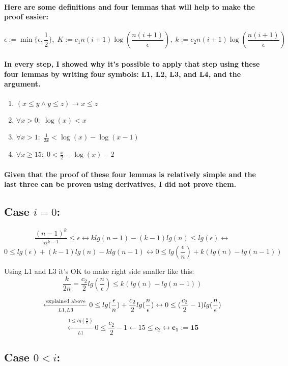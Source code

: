 \documentclass[oneside]{book}
\newcommand{\myparagraph}[1]{\paragraph{\textnormal{#1}}}
\begin{document}
\myparagraph{
Here are some definitions and four lemmas that will help to make the proof easier:
}

$$\epsilon := \min\{\epsilon, \frac{1}{2}\}, \; K := c_1n(i+1)\log(\frac{n(i+1)}{\epsilon}),\; k := c_2n(i+1)\log(\frac{n(i+1)}{\epsilon})$$

\myparagraph{
In every step, I showed why it's possible to apply that step using these four lemmas by writing four symbols: L1, L2, L3, and L4, and the argument.
}

\begin{enumerate}
    \item{$(x \le y \land y \le z) \rightarrow x \le z$}
    \item{$\forall x > 0: \; \log(x) < x$}
    \item{$\forall x > 1: \; \frac{1}{2x} < \log(x) - \log(x-1)$}
    \item{$\forall x \ge 15: \; 0 < \frac{x}{2} - \log(x) - 2$}
\end{enumerate}

\myparagraph{
Given that the proof of these four lemmas is relatively simple and the last three can be proven using derivatives, I did not prove them.
}

\subsection{Case $i = 0$:}

$$\frac{(n-1)^k}{n^{k-1}} \le \epsilon\leftrightarrow  k lg(n-1) - (k-1) lg(n) \le lg(\epsilon) \leftrightarrow $$
$$0 \le lg(\epsilon) + (k-1) lg(n) - k lg(n-1) \leftrightarrow 0 \le lg(\frac{\epsilon}{n}) + k(lg(n) - lg(n - 1))$$
\begin{tcolorbox}
Using L1 and L3 it's OK to make right side smaller like this:\newline
$$\frac{k}{2n} = \frac{c_2}{2}lg(\frac{n}{\epsilon}) \le k(lg(n) - lg(n-1))$$
\end{tcolorbox}
$$\xleftarrow[L1, L3]{\textnormal{explained above}} 0 \le lg(\frac{\epsilon}{n}) + \frac{c_2}{2}lg(\frac{n}{\epsilon}) \leftrightarrow 0 \le (\frac{c_2}{2} - 1)lg(\frac{n}{\epsilon})$$
$$\xleftarrow[L1]{1 \le lg(\frac{n}{\epsilon})} 0 \le \frac{c_2}{2} - 1 \leftarrow 15 \le c_2 \leftrightarrow \mathbf{c_1 := 15}$$

\subsection{Case $0 < i$:}
\end{document}
